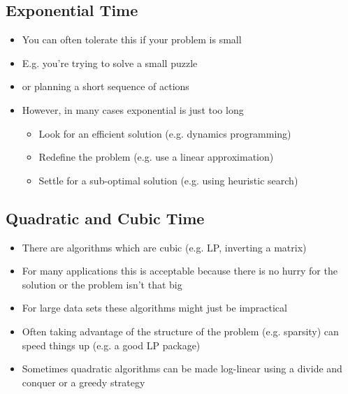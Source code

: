 
\begin{slide}
\section{Exponential Time}

\begin{PauseHighLight}
  \begin{itemize}
  \item You can often tolerate this if your problem is small\pause
  \item E.g. you're trying to solve a small puzzle\pause
  \item or planning a short sequence of actions\pause
  \item However, in many cases exponential is just too long
    \begin{itemize}
    \item Look for an efficient solution (e.g. dynamics programming)\pause
    \item Redefine the problem (e.g. use a linear approximation)\pause
    \item Settle for a sub-optimal solution  (e.g. using heuristic
      search)\pause
    \end{itemize}
  \end{itemize}
\end{PauseHighLight}

\end{slide}


\begin{slide}
\section{Quadratic and Cubic Time}

\begin{PauseHighLight}
  \begin{itemize}
  \item There are algorithms which are cubic (e.g. LP, inverting a
    matrix)\pause
  \item For many applications this is acceptable because there is no
    hurry for the solution or the problem isn't that big\pause
  \item For large data sets these algorithms might just be
    impractical\pause
  \item Often taking advantage of the structure of the problem
    (e.g. sparsity) can speed things up (e.g. a good LP package)\pause
  \item Sometimes quadratic algorithms can be made log-linear using a
    divide and conquer or a greedy strategy\pause
  \end{itemize}
\end{PauseHighLight}

\end{slide}

